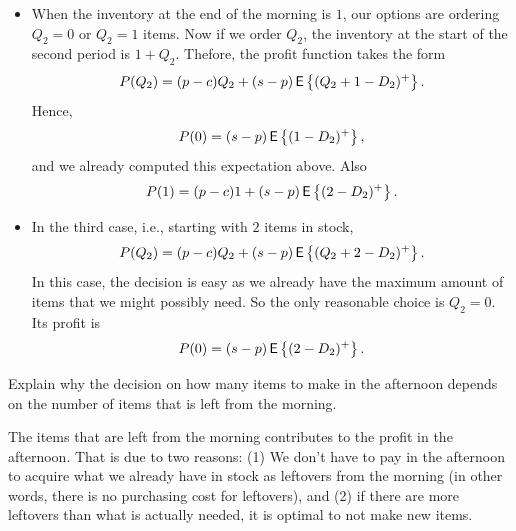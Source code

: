 \begin{question}
\begin{solution}
\begin{itemize}
\item When the inventory at the end of the morning is $1$,  our options are ordering $Q_2=0$ or $Q_2=1$ items. Now if we order $Q_2$, the inventory at the start of the second period is $1+Q_2$. Thefore, the profit function takes the form
    \begin{equation*}
P(Q_2) = (p -c)Q_2  + (s-p)\,\mathsf{E}\left\{(Q_2+1-D_2)^+\right\}. 
\end{equation*}
Hence, 
    \begin{equation*}
P(0) = (s-p)\,\mathsf{E}\left\{(1-D_2)^+\right\},
\end{equation*}
and we already computed this expectation above. Also
    \begin{equation*}
P(1) = (p -c)1  + (s-p)\,\mathsf{E}\left\{(2-D_2)^+\right\}. 
\end{equation*}
  
  \item In the third case, i.e., starting with $2$ items in stock, 
    \begin{equation*}
P(Q_2) = (p -c)Q_2  + (s-p)\,\mathsf{E}\left\{(Q_2+2-D_2)^+\right\}. 
\end{equation*}
In this case, the  decision is easy as we already have the maximum amount of items that we might possibly need. So the only reasonable choice is $Q_2=0$.  Its profit is 
    \begin{equation*}
P(0) = (s-p)\,\mathsf{E}\left\{(2-D_2)^+\right\}. 
\end{equation*}
\end{itemize}
\end{solution}
\end{question}

\begin{question}
Explain why the decision on how many items to make in the afternoon depends on the number of items that is left from the morning. 

\begin{solution}
The items that are left from the morning contributes to the profit in the afternoon. That is due to two reasons: (1) We don't have to pay in the afternoon to acquire what we already have in stock as leftovers from the morning (in other words, there is no purchasing cost for leftovers), and (2) if there are more leftovers  than what is actually needed, it is optimal  to not make new items. 
\end{solution}
\end{question}


